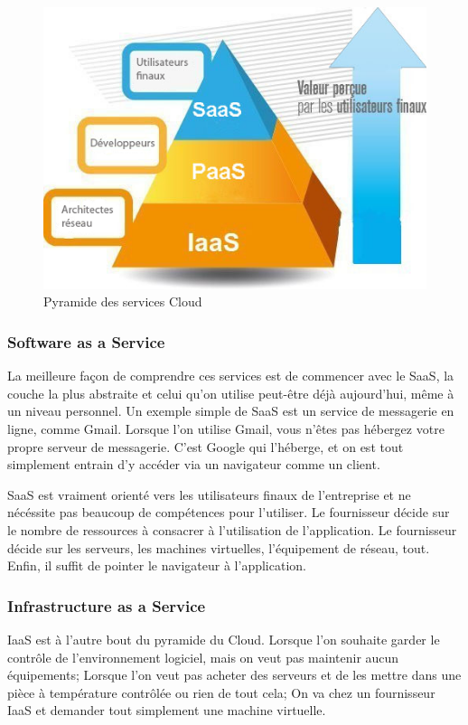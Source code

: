 \begin{onehalfspace}
\begin{figure}[H]
\centering
\includegraphics [scale=0.7]{chapitre2/assets/pyramide}
\caption{Pyramide des services Cloud}
\end{figure}

\subsubsection*{Software as a Service}

La meilleure façon de comprendre ces services est de commencer avec le SaaS, la couche la plus abstraite et celui qu'on utilise peut-être déjà aujourd'hui, même à un niveau personnel. Un exemple simple de SaaS est un service de messagerie en ligne, comme Gmail. Lorsque l'on utilise Gmail, vous n'êtes pas hébergez votre propre serveur de messagerie. C'est Google qui l'héberge, et on est tout simplement entrain d'y accéder via un navigateur comme un client.

SaaS est vraiment orienté vers les utilisateurs finaux de l'entreprise et ne nécéssite pas beaucoup de compétences pour l'utiliser. Le fournisseur décide sur le nombre de ressources à consacrer à l'utilisation de l'application. Le fournisseur décide sur les serveurs, les machines virtuelles, l'équipement de réseau, tout. Enfin, il suffit de pointer le navigateur à l'application.

\subsubsection*{Infrastructure as a Service}

IaaS est à l'autre bout du pyramide du Cloud. Lorsque l'on souhaite garder le contrôle de l'environnement logiciel, mais on veut pas maintenir aucun équipements; Lorsque l'on veut pas acheter des serveurs et de les mettre dans une pièce à température contrôlée ou rien de tout cela; On va chez un fournisseur IaaS et demander tout simplement une machine virtuelle.


\end{onehalfspace}
